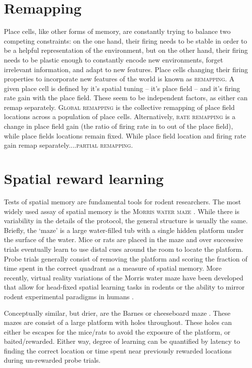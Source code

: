 \section{Remapping}
Place cells, like other forms of memory, are constantly trying to balance two competing constraints: on the one hand, their firing needs to be stable in order to be a helpful representation of the environment, but on the other hand, their firing needs to be plastic enough to constantly encode new environments, forget irrelevant information, and adapt to new features.
Place cells changing their firing properties to incorporate new features of the world is known as \textsc{remapping}.
A given place cell is defined by it's spatial tuning -- it's place field -- and it's firing rate gain with the place field.
These seem to be independent factors, as either can remap separately.
\textsc{Global remapping} is the collective remapping of place field locations across a population of place cells.
Alternatively, \textsc{rate remapping} is a change in place field gain (the ratio of firing rate in to out of the place field), while place fields locations remain fixed.
While place field location and firing rate gain remap separately....\textsc{partial remapping}.



\section{Spatial reward learning}\label{sec:intro:hpc:spatial-reward}
Tests of spatial memory are fundamental tools for rodent researchers.
The most widely used assay of spatial memory is the \textsc{Morris water maze} \citep{Morris1984}.
While there is variability in the details of the protocol, the general structure is usually the same.
Briefly, the `maze' is a large water-filled tub with a single hidden platform under the surface of the water.
Mice or rats are placed in the maze and over successive trials eventually learn to use distal cues around the room to locate the platform.
Probe trials generally consist of removing the platform and scoring the fraction of time spent in the correct quadrant as a measure of spatial memory.
More recently, virtual reality variations of the Morris water maze have been developed that allow for head-fixed spatial learning tasks in rodents \citep{Aronov2014} or the ability to mirror rodent experimental paradigms in humans \citep{}. 

Conceptually similar, but drier, are the Barnes or cheeseboard maze \citep{Barnes1979}\citep{Kesner1991}\citep{Dupret2010a}.
These mazes are consist of a large platform with holes throughout.
These holes can either be escapes for the mice/rats to avoid the exposure of the platform, or baited/rewarded.
Either way, degree of learning can be quantified by latency to finding the correct location or time spent near previously rewarded locations during un-rewarded probe trials.



